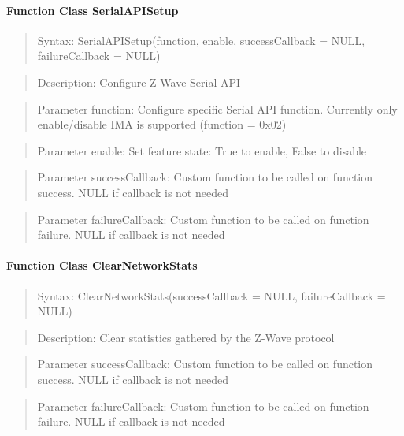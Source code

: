 \paragraph{Function Class SerialAPISetup}
\begin{quote}Syntax: SerialAPISetup(function, enable, successCallback = NULL, failureCallback = NULL)\end{quote}
\begin{quote}Description: Configure Z-Wave Serial API\end{quote}
\begin{quote}Parameter function: Configure specific Serial API function. Currently only enable/disable IMA is supported (function = 0x02)\end{quote}
\begin{quote}Parameter enable: Set feature state: True to enable, False to disable\end{quote}
\begin{quote}Parameter successCallback: Custom function to be called on function success. NULL if callback is not needed\end{quote}
\begin{quote}Parameter failureCallback: Custom function to be called on function failure. NULL if callback is not needed\end{quote}


\paragraph{Function Class ClearNetworkStats}
\begin{quote}Syntax: ClearNetworkStats(successCallback = NULL, failureCallback = NULL)\end{quote}
\begin{quote}Description: Clear statistics gathered by the Z-Wave protocol\end{quote}
\begin{quote}Parameter successCallback: Custom function to be called on function success. NULL if callback is not needed\end{quote}
\begin{quote}Parameter failureCallback: Custom function to be called on function failure. NULL if callback is not needed\end{quote}


